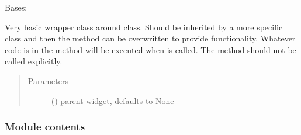 \documentclass[letterpaper,10pt,english]{sphinxmanual}
\begin{document}

\begin{fulllineitems}
\label{\detokenize{polo.threads:polo.threads.thread.thread}}
Bases: 

Very basic wrapper class around  class. Should be
inherited by a more specific class and then the  method
can be overwritten to provide functionality. Whatever code is in the
{\hyperref[\detokenize{polo.threads:polo.threads.thread.thread.run}]{}} method will be executed when
 is called. The
{\hyperref[\detokenize{polo.threads:polo.threads.thread.thread.run}]{}} method should not be called
explicitly.
\begin{quote}\begin{description}
\item[{Parameters}] \leavevmode
{} (\sphinxstyleliteralemphasis{\sphinxupquote{, }}) \textendash{} parent widget, defaults to None

\end{description}\end{quote}

\begin{fulllineitems}
\label{\detokenize{polo.threads:polo.threads.thread.thread.run}}
\end{fulllineitems}


\end{fulllineitems}



\subsubsection{Module contents}
\label{\detokenize{polo.threads:module-polo.threads}}\label{\detokenize{polo.threads:module-contents}}
\end{document}
